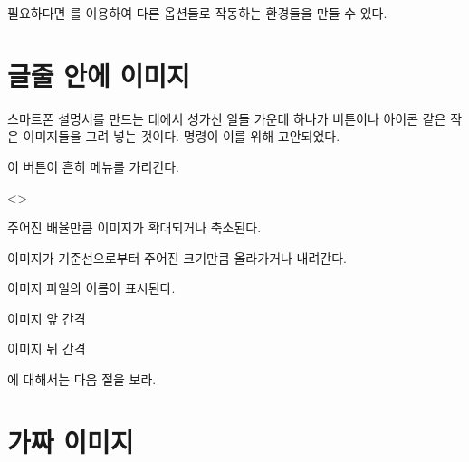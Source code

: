 \documentclass[minted]{hzguide}
\begin{document}
필요하다면 를 이용하여 다른 옵션들로 작동하는 환경들을 만들 수 있다.


\section{글줄 안에 이미지}

스마트폰 설명서를 만드는 데에서 성가신 일들 가운데 하나가 버튼이나 아이콘 같은 작은 이미지들을 그려 넣는 것이다. \macro{\img} 명령이 이를 위해 고안되었다.

\begin{coderesult}
이 버튼이  흔히 메뉴를 가리킨다.
\end{coderesult}

\begin{code}
\end{code}

\begin{macros}<\LineImageSetup>
\item[scale] 
주어진 배율만큼 이미지가 확대되거나 축소된다.

\item[raise] \keyvalue{-0.25ex}
이미지가 기준선으로부터 주어진 크기만큼 올라가거나 내려간다.

\item[showfilename] \keyvalueTF
이미지 파일의 이름이 표시된다.

\item[before] \keyvalue{\space}
이미지 앞 간격

\item[after] \keyvalue{\space}
이미지 뒤 간격
\end{macros}

\macro{\img*}에 대해서는 다음 절을 보라.

\section{가짜 이미지}
\label{sec:fakeimage}
\end{document}
